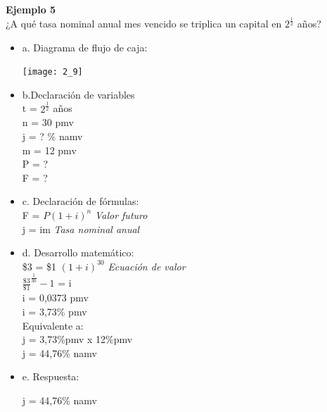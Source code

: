 \textbf{Ejemplo 5}\\

¿A qué tasa nominal anual mes vencido se triplica un capital en $2^{\frac{1}{2}}$ años?\\

\begin{itemize}
	\item a. Diagrama de flujo de caja:\\
	\begin{center}
		\texttt{[image: 2\_9]}\\
	\end{center}
	
	\item b.Declaración de variables\\
	
	t = $2^{\frac{1}{2}}$ años\\
	n = 30 pmv\\
	j = ? \% namv \\
	m = 12 pmv\\
	P = ? \\
	F = ? \\
	
	\item c. Declaración de fórmulas:\\
	
	F = $ P(1 + i)^n$ \hspace{35 pt} \textit{Valor futuro}\\
	
	j = im \hspace{35 pt} \textit{Tasa nominal anual}\\
	
	\item d. Desarrollo matemático:\\
	
	\$3 = \$1 $(1 + i)^{30}$ \hspace{35 pt} \textit{Ecuación de valor}\\
	
	$\frac{\$3}{\$1}^{\frac{1}{30}} - 1$ = i\\
	
	i = 0,0373 pmv\\
	i = 3,73\% pmv\\
	
	Equivalente a:\\
	
	j = 3,73\%pmv x 12\%pmv\\
	j = 44,76\% namv\\
	
	\item e. Respuesta:
	
	j = 44,76\% namv\\
	
\end{itemize}

